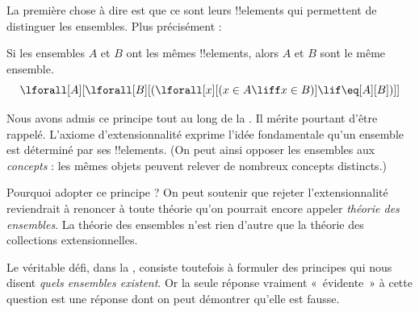 \documentclass[../../../include/open-logic-section]{subfiles}
\begin{document}

La première chose à dire est que ce sont leurs !!{element}s qui
permettent de distinguer les ensembles. Plus précisément :

\begin{axiom}[Extensionnalité]
Si les ensembles $A$ et $B$ ont les mêmes !!{element}s, alors $A$ et $B$
sont le même ensemble.
\[
  \lforall[A][\lforall[B][(\lforall[x][(x \in A \liff x \in B)] \lif
  \eq[A][B])]]
\]
\end{axiom}

Nous avons admis ce principe tout au long de la .
Il mérite pourtant d'être rappelé. L'axiome d'extensionnalité exprime
l'idée fondamentale qu'un ensemble est déterminé par ses !!{element}s.
(On peut ainsi opposer les ensembles aux \emph{concepts} : les mêmes
objets peuvent relever de nombreux concepts distincts.)

Pourquoi adopter ce principe ? On peut soutenir que rejeter
l'extensionnalité reviendrait à renoncer à toute théorie qu'on pourrait
encore appeler \emph{théorie des ensembles}. La théorie des ensembles
n'est rien d'autre que la théorie des collections extensionnelles.

Le véritable défi, dans la , consiste toutefois à
formuler des principes qui nous disent \emph{quels ensembles existent}.
Or la seule réponse vraiment «~évidente~» à cette question est une
réponse dont on peut démontrer qu'elle est fausse.
\end{document}
